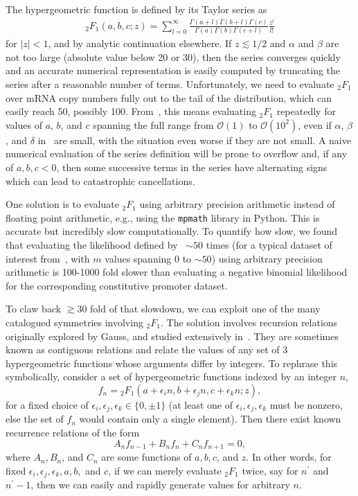 The hypergeometric function is defined by its Taylor series as
\begin{align}
{_2F_1}(a,b,c;z) 
= \sum_{l=0}^\infty
\frac{\Gamma(a + l)\Gamma(b + l)\Gamma(c)}
        {\Gamma(a)\Gamma(b)\Gamma(c + l)}
\frac{z^l}{l!}
\end{align}
for $|z|<1$, and by analytic continuation elsewhere.
If $z\lesssim1/2$ and $\alpha$ and $\beta$ are not too large
(absolute value below 20 or 30),
then the series converges quickly and an accurate numerical representation is
easily computed by truncating the series after a reasonable number of terms.
Unfortunately, we need to evaluate ${_2F_1}$ over mRNA copy numbers fully out
to the tail of the distribution, which can easily reach 50, possibly 100.
From~, this means evaluating ${_2F_1}$
repeatedly for values of $a$, $b$, and $c$ spanning the full range
from $\mathcal{O}(1)$ to $\mathcal{O}(10^2)$,
even if $\alpha$, $\beta$, and $\delta$
in~ are small,
with the situation even worse if they are not small.
A naive numerical evaluation of the series definition will be
prone to overflow and, if any of $a,b,c<0$, then some successive terms in the
series have alternating signs which can lead to catastrophic cancellations.

One solution is to evaluate ${_2F_1}$ using arbitrary precision arithmetic
instead of floating point arithmetic,
e.g., using the \texttt{mpmath} library in Python.
This is accurate but incredibly slow computationally.
To quantify how slow, we found that
evaluating the likelihood defined by~ $\sim50$ times
(for a typical dataset of interest from~\cite{Jones2014},
with $m$ values spanning 0 to $\sim50$)
using arbitrary precision arithmetic is 100-1000 fold slower than
evaluating a negative binomial likelihood for the corresponding
constitutive promoter dataset.

To claw back $\gtrsim30$ fold of that slowdown, we can exploit
one of the many catalogued symmetries involving ${_2F_1}$.
The solution involves recursion relations originally explored by Gauss,
and studied extensively in~\cite{Pearson2017, Gil2007}.
They are sometimes known as contiguous relations and relate the values
of any set of 3 hypergeometric functions whose arguments differ by integers.
To rephrase this symbolically, consider a set of hypergeometric functions
indexed by an integer $n$,
\begin{equation}
f_n = {_2F_1}(a+\epsilon_i n, b+\epsilon_j n, c+\epsilon_k n; z),
\end{equation}
for a fixed choice of $\epsilon_i, \epsilon_j, \epsilon_k \in \{0,\pm 1\}$
(at least one of $\epsilon_i, \epsilon_j, \epsilon_k$ must be nonzero,
else the set of $f_n$ would contain only a single element).
Then there exist known recurrence relations of the form
\begin{equation}
A_n f_{n-1} + B_n f_{n} + C_n f_{n+1} = 0,
\end{equation}
where $A_n, B_n$, and $C_n$ are some functions of $a,b,c$, and $z$.
In other words, for fixed $\epsilon_i, \epsilon_j, \epsilon_k, a, b,$ and $c$,
if we can merely evaluate ${_2F_1}$ twice, say for $n^\prime$ and $n^\prime-1$,
then we can easily and rapidly generate values for arbitrary $n$.

